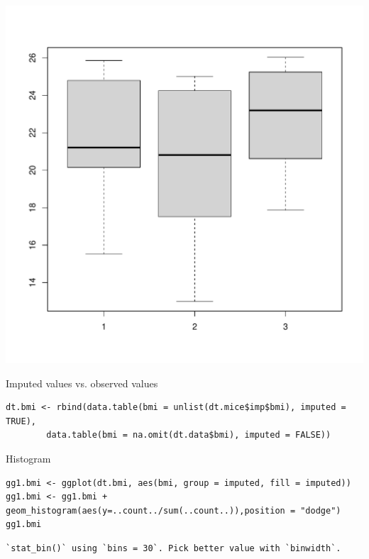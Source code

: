 \documentclass[12pt]{article}
\begin{document}
\begin{center}
\includegraphics[width=.9\linewidth]{./figures/boxplotImputed.pdf}
\end{center}

\clearpage

Imputed values vs. observed values
\lstset{language=r,label= ,caption= ,captionpos=b,numbers=none}
\begin{lstlisting}
dt.bmi <- rbind(data.table(bmi = unlist(dt.mice$imp$bmi), imputed = TRUE),
		data.table(bmi = na.omit(dt.data$bmi), imputed = FALSE))
\end{lstlisting}

Histogram
\lstset{language=r,label= ,caption= ,captionpos=b,numbers=none}
\begin{lstlisting}
gg1.bmi <- ggplot(dt.bmi, aes(bmi, group = imputed, fill = imputed))
gg1.bmi <- gg1.bmi + geom_histogram(aes(y=..count../sum(..count..)),position = "dodge")
gg1.bmi
\end{lstlisting}

\begin{verbatim}
`stat_bin()` using `bins = 30`. Pick better value with `binwidth`.
\end{verbatim}
\end{document}
